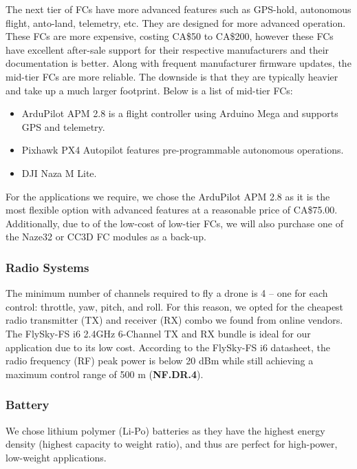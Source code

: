 The next tier of FCs have more advanced features such as GPS-hold, autonomous flight, anto-land, 
telemetry, etc. They are designed for more advanced operation. These FCs are more expensive, costing 
CA\$50 to CA\$200, however these FCs have excellent after-sale support for their respective 
manufacturers and their documentation is better. Along 
with frequent manufacturer firmware updates, the mid-tier FCs are more reliable. The downside is that 
they are typically heavier and take up a much larger footprint. 
Below is a list of mid-tier FCs:

\begin{itemize}[noitemsep,topsep=0pt, parsep=4pt, partopsep=0pt]
    \item ArduPilot APM 2.8 is a flight controller using Arduino Mega and supports GPS and telemetry.
    \item Pixhawk PX4 Autopilot features pre-programmable autonomous operations.
    \item DJI Naza M Lite.
\end{itemize}

For the applications we require, we chose the ArduPilot APM 2.8 as it is the most flexible option with advanced features at a reasonable price of CA\$75.00. Additionally, due to of the low-cost of low-tier FCs, we will also purchase one of the Naze32 or CC3D FC modules as a back-up.

\subsubsection{Radio Systems}

The minimum number of channels required to fly a drone is 4 -- one for each control: throttle, yaw, 
pitch, and roll. For this reason, we opted for the cheapest radio transmitter (TX) and receiver  (RX) 
combo we found from online vendors. 
The FlySky-FS i6 2.4GHz 6-Channel TX and RX bundle is ideal for our application due to its low cost.
According to the FlySky-FS i6 datasheet\cite{flyskyi6}, the radio frequency (RF) peak power is below 20 dBm while still achieving a maximum control range of 500 m (\textbf{NF.DR.4}).

\subsubsection{Battery}

We chose lithium polymer (Li-Po) batteries as they have the highest energy density (highest 
capacity to weight ratio), and thus are perfect for high-power, low-weight applications. 

